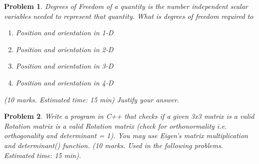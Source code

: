 \documentclass{article}
\newtheorem{prob}{Problem}
\newif\ifsol
\begin{document}
\begin{prob}
  Degrees of Freedom of a quantity is the number independent scalar variables
  needed to represent that quantity. What is degrees of freedom required to 
  \begin{enumerate}
    \item Position and orientation in 1-D
    \item Position and orientation in 2-D
    \item Position and orientation in 3-D
    \item Position and orientation in 4-D
  \end{enumerate} (10 marks. Estimated time: 15 min)
  Justify your answer.
\end{prob}

\ifsol
\paragraph*{Solution}
\begin{enumerate}
  \item 1D: position requires 1-DoF,  orientation requires a binary flag.
  \item 2D: position requires 2-DoF, orientation requires a single angle: 1-DoF.
  \item 3D: position requires 3-DoF, orientation requires 3-DoF because there
    are three pairs of axis X-Y, Y-Z, Z-X.
  \item 4D: position requires 4-DoF, orientation requires 6-DoF because there
    are 6 pairs of axis: $^4C_2 = 6$.
\end{enumerate}
\fi

\begin{prob}
  Write a program in C++ that checks if a given
  3x3 matrix is a valid Rotation matrix is a valid Rotation matrix  (check for
  orthonormality i.e. orthogonality and determinant = 1). You may use Eigen's
  matrix multiplication and determinant() function. (10 marks. Used in the
  following problems. Estimated time: 15 min). 
\end{prob}

\ifsol
\paragraph*{Solution}
Please look at the function \verb|is_valid_rot| in file \verb|hw1.cpp|.
\fi
\end{document}
